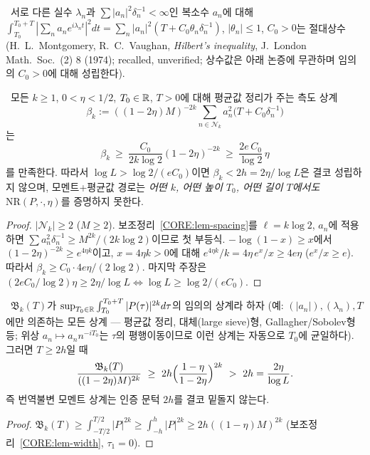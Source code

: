 \begin{theorem}\label{CORE:ext-MV}
\EXT\ 서로 다른 실수 $\lambda_n$과 $\sum|a_n|^2\delta_n^{-1}<\infty$인 복소수 $a_n$에 대해
$\int_{T_0}^{T_0+T}|\sum_na_ne^{i\lambda_n t}|^2dt=\sum_n|a_n|^2(T+C_0\theta_n\delta_n^{-1})$, $|\theta_n|\le1$, $C_0>0$는 절대상수
(H.~L.~Montgomery, R.~C.~Vaughan, \emph{Hilbert's inequality}, J.~London Math.~Soc.~(2) 8 (1974); recalled, unverified; 상수값은 아래 논증에 무관하며 임의의 $C_0>0$에 대해 성립한다).
\end{theorem}

\begin{theorem}\label{CORE:thm-MV-barrier}
\PROVED\ 모든 $k\ge1$, $0<\eta<1/2$, $T_0\in\mathbb{R}$, $T>0$에 대해 평균값 정리가 주는 측도 상계
\[
\beta_k:=((1-2\eta)M)^{-2k}\sum_{n\in\mathcal N_k}a_n^2\bigl(T+C_0\delta_n^{-1}\bigr)
\]
는
\[
\beta_k\ \ge\ \frac{C_0}{2k\log 2}(1-2\eta)^{-2k}\ \ge\ \frac{2e\,C_0}{\log 2}\,\eta
\]
를 만족한다. 따라서 $\log L>\log2/(eC_0)$이면 $\beta_k<2h=2\eta/\log L$은 결코 성립하지 않으며, 모멘트+평균값 경로는 \emph{어떤 $k$, 어떤 높이 $T_0$, 어떤 길이 $T$에서도} $\mathrm{NR}(P,\cdot,\eta)$를 증명하지 못한다.
\end{theorem}
\begin{proof}
$|\mathcal N_k|\ge2$ ($M\ge2$). 보조정리~\ref{CORE:lem-spacing}를 $\ell=k\log2$, $a_n$에 적용하면 $\sum a_n^2\delta_n^{-1}\ge M^{2k}/(2k\log2)$이므로 첫 부등식. $-\log(1-x)\ge x$에서 $(1-2\eta)^{-2k}\ge e^{4\eta k}$이고, $x=4\eta k>0$에 대해 $e^{4\eta k}/k=4\eta\,e^x/x\ge4e\eta$ ($e^x/x\ge e$). 따라서 $\beta_k\ge C_0\cdot4e\eta/(2\log 2)$. 마지막 주장은 $(2eC_0/\log2)\eta\ge2\eta/\log L\iff\log L\ge\log2/(eC_0)$.
\end{proof}

\begin{theorem}\label{CORE:thm-TI-barrier}
\PROVED\ $\mathfrak B_k(T)$가 $\sup_{T_0\in\mathbb{R}}\int_{T_0}^{T_0+T}|P(\tau)|^{2k}d\tau$의 임의의 상계라 하자 (예: $(|a_n|),(\lambda_n),T$에만 의존하는 모든 상계 --- 평균값 정리, 대체(large sieve)형, Gallagher/Sobolev형 등; 위상 $a_n\mapsto a_n n^{-iT_0}$는 $\tau$의 평행이동이므로 이런 상계는 자동으로 $T_0$에 균일하다). 그러면 $T\ge 2h$일 때
\[
\frac{\mathfrak B_k(T)}{((1-2\eta)M)^{2k}}\ \ge\ 2h\Bigl(\frac{1-\eta}{1-2\eta}\Bigr)^{2k}\ >\ 2h=\frac{2\eta}{\log L}.
\]
즉 번역불변 모멘트 상계는 인증 문턱 $2h$를 결코 밑돌지 않는다.
\end{theorem}
\begin{proof}
$\mathfrak B_k(T)\ge\int_{-T/2}^{T/2}|P|^{2k}\ge\int_{-h}^{h}|P|^{2k}\ge2h((1-\eta)M)^{2k}$ (보조정리~\ref{CORE:lem-width}, $\tau_1=0$).
\end{proof}

